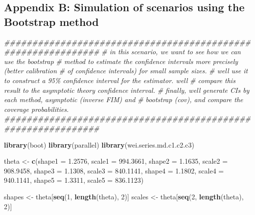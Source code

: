 \documentclass[
]{article}
\newenvironment{Shaded}{\begin{snugshade}}{\end{snugshade}}
\newcommand{\CommentTok}[1]{\textcolor[rgb]{0.56,0.35,0.01}{\textit{#1}}}
\newcommand{\DataTypeTok}[1]{\textcolor[rgb]{0.13,0.29,0.53}{#1}}
\newcommand{\DecValTok}[1]{\textcolor[rgb]{0.00,0.00,0.81}{#1}}
\newcommand{\FloatTok}[1]{\textcolor[rgb]{0.00,0.00,0.81}{#1}}
\newcommand{\KeywordTok}[1]{\textcolor[rgb]{0.13,0.29,0.53}{\textbf{#1}}}
\newcommand{\NormalTok}[1]{#1}
\newcommand{\StringTok}[1]{\textcolor[rgb]{0.31,0.60,0.02}{#1}}
\begin{document}
\hypertarget{appendix-b-simulation-of-scenarios-using-the-bootstrap-method}{%
\subsection*{Appendix B: Simulation of scenarios using the Bootstrap
method}\label{appendix-b-simulation-of-scenarios-using-the-bootstrap-method}}

\begin{Shaded}
\begin{Highlighting}[]
\CommentTok{\#\#\#\#\#\#\#\#\#\#\#\#\#\#\#\#\#\#\#\#\#\#\#\#\#\#\#\#\#\#\#\#\#\#\#\#\#\#\#\#\#\#\#\#\#\#\#\#\#\#\#\#\#\#\#\#\#\#\#\#\#}
\CommentTok{\# in this scenario, we want to see how we can use the bootstrap}
\CommentTok{\# method to estimate the confidence intervals more precisely (better calibration}
\CommentTok{\# of confidence intervals) for small sample sizes.}
\CommentTok{\# we\textquotesingle{}ll use it to construct a 95\% confidence interval for the estimator. we\textquotesingle{}ll}
\CommentTok{\# compare this result to the asymptotic theory confidence interval.}
\CommentTok{\# finally, we\textquotesingle{}ll generate CIs by each method, asymptotic (inverse FIM) and }
\CommentTok{\# bootstrap (cov), and compare the coverage probabilities.}
\CommentTok{\#\#\#\#\#\#\#\#\#\#\#\#\#\#\#\#\#\#\#\#\#\#\#\#\#\#\#\#\#\#\#\#\#\#\#\#\#\#\#\#\#\#\#\#\#\#\#\#\#\#\#\#\#\#\#\#\#\#\#\#\#}

\KeywordTok{library}\NormalTok{(boot)}
\KeywordTok{library}\NormalTok{(parallel)}
\KeywordTok{library}\NormalTok{(wei.series.md.c1.c2.c3)}

\NormalTok{theta \textless{}{-}}\StringTok{ }\KeywordTok{c}\NormalTok{(}\DataTypeTok{shape1 =} \FloatTok{1.2576}\NormalTok{, }\DataTypeTok{scale1 =} \FloatTok{994.3661}\NormalTok{,}
           \DataTypeTok{shape2 =} \FloatTok{1.1635}\NormalTok{, }\DataTypeTok{scale2 =} \FloatTok{908.9458}\NormalTok{,}
           \DataTypeTok{shape3 =} \FloatTok{1.1308}\NormalTok{, }\DataTypeTok{scale3 =} \FloatTok{840.1141}\NormalTok{,}
           \DataTypeTok{shape4 =} \FloatTok{1.1802}\NormalTok{, }\DataTypeTok{scale4 =} \FloatTok{940.1141}\NormalTok{,}
           \DataTypeTok{shape5 =} \FloatTok{1.3311}\NormalTok{, }\DataTypeTok{scale5 =} \FloatTok{836.1123}\NormalTok{)}

\NormalTok{shapes \textless{}{-}}\StringTok{ }\NormalTok{theta[}\KeywordTok{seq}\NormalTok{(}\DecValTok{1}\NormalTok{, }\KeywordTok{length}\NormalTok{(theta), }\DecValTok{2}\NormalTok{)]}
\NormalTok{scales \textless{}{-}}\StringTok{ }\NormalTok{theta[}\KeywordTok{seq}\NormalTok{(}\DecValTok{2}\NormalTok{, }\KeywordTok{length}\NormalTok{(theta), }\DecValTok{2}\NormalTok{)]}


\end{Highlighting}
\end{Shaded}
\end{document}
